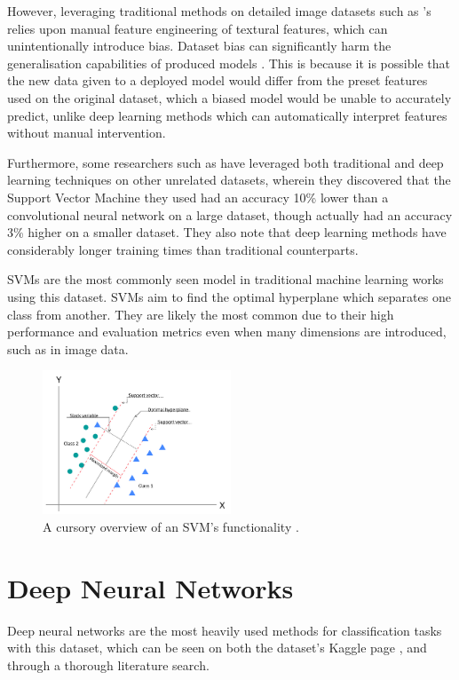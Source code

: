 \documentclass[12pt]{report}
\newcommand{\para}{\vspace{7pt}\noindent}
\begin{document}
\para However, leveraging traditional methods on detailed image datasets such as \textcite{kermanyIdentifyingMedicalDiagnoses2018}'s
relies upon manual feature engineering of textural features, which can unintentionally introduce bias. Dataset bias can significantly harm the generalisation capabilities of produced models \autocite{selvarajuGradCAMVisualExplanations2017}.
This is because it is possible that the new data given to a deployed model would differ from the preset features used on the original dataset,
which a biased model would be unable to accurately predict, unlike deep learning methods which can automatically interpret features without 
manual intervention.

\para Furthermore, some researchers such as \textcite{wangComparativeAnalysisImage2021} have leveraged both traditional and deep learning 
techniques on other unrelated datasets, wherein they discovered that the Support Vector Machine they used had an accuracy 10\% lower than 
a convolutional neural network on a large dataset, though actually had an accuracy 3\% higher on a smaller dataset. They also note that
deep learning methods have considerably longer training times than traditional counterparts.

\para SVMs are the most commonly seen model in traditional machine learning works using this dataset.
SVMs aim to find the optimal hyperplane which separates one class from another. They are likely the most common due to their high performance and 
evaluation metrics even when many dimensions are introduced, such as in image data. 

\begin{figure}[H]
    \centering
    \includegraphics[width=0.5\textwidth]{Proposal/SVM.png}
    \caption{A cursory overview of an SVM's functionality \autocite{ibmWhatSupportVector2023}.\label{fig:SVM}}
\end{figure}


\section{Deep Neural Networks}
Deep neural networks are the most heavily used methods for classification tasks with this dataset, which can be seen on both the 
dataset's Kaggle page \autocite{mooneyChestXRayImages2018}, and through a thorough literature search.
\end{document}
